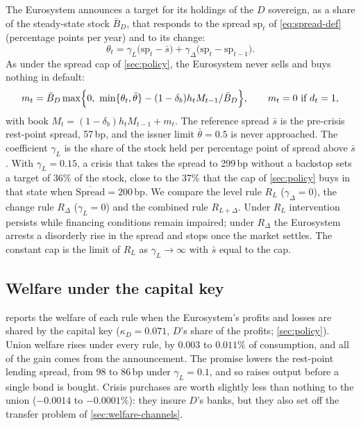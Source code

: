 The Eurosystem announces a target for its holdings of the $D$ sovereign, as a share of the
steady-state stock $\bar B_D$, that responds to the spread $\mathrm{sp}_t$ of \eqref{eq:spread-def}
(percentage points per year) and to its change:
\begin{equation}
\theta_t=\gamma_L\bigl(\mathrm{sp}_t-\bar s\bigr)+\gamma_\Delta\bigl(\mathrm{sp}_t-\mathrm{sp}_{t-1}\bigr).
\label{eq:gamma-rule}
\end{equation}
As under the spread cap of \cref{sec:policy}, the Eurosystem never sells and buys nothing in default:
\begin{equation}
m_t=\bar B_D\max\Bigl\{0,\ \min\{\theta_t,\bar\theta\}-(1-\delta_b)h_tM_{t-1}/\bar B_D\Bigr\},
\qquad m_t=0\ \text{if}\ d_t=1,
\label{eq:gamma-purchases}
\end{equation}
with book $M_t=(1-\delta_b)h_tM_{t-1}+m_t$. The reference spread $\bar s$ is the pre-crisis
rest-point spread, 57\,bp, and the issuer limit $\bar\theta=0.5$ is never approached. The coefficient
$\gamma_L$ is the share of the stock held per percentage point of spread above $\bar s$. With
$\gamma_L=0.15$, a crisis that takes the spread to 299\,bp without a backstop sets a target of 36\% of
the stock, close to the 37\% that the cap of \cref{sec:policy} buys in that state when
$\overline{\text{Spread}}=200$\,bp. We compare the level rule $R_L$ ($\gamma_\Delta=0$), the change
rule $R_\Delta$ ($\gamma_L=0$) and the combined rule $R_{L+\Delta}$. Under $R_L$ intervention persists
while financing conditions remain impaired; under $R_\Delta$ the Eurosystem arrests a disorderly rise
in the spread and stops once the market settles. The constant cap is the limit of $R_L$ as
$\gamma_L\to\infty$ with $\bar s$ equal to the cap.

\subsection{Welfare under the capital key}
\label{sec:welfare-results}

 reports the welfare of each rule when the Eurosystem's profits and losses are
shared by the capital key ($\kappa_D=0.071$, $D$'s share of the profits; \cref{sec:policy}). Union welfare rises
under every rule, by $0.003$ to $0.011\%$ of consumption, and all of the gain comes from the
announcement. The promise lowers the rest-point lending spread, from 98 to 86\,bp under
$\gamma_L=0.1$, and so raises output before a single bond is bought. Crisis purchases are worth
slightly less than nothing to the union ($-0.0014$ to $-0.0001\%$): they insure $D$'s banks, but they
also set off the transfer problem of \cref{sec:welfare-channels}.

